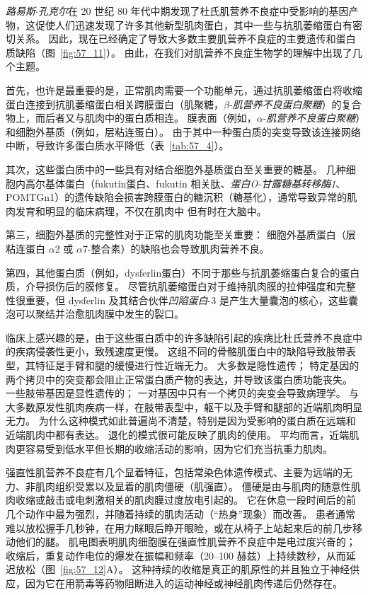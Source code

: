 \textit{路易斯$\cdot$孔克尔}在 20 世纪 80 年代中期发现了杜氏肌营养不良症中受影响的基因产物，这促使人们迅速发现了许多其他新型肌肉蛋白，其中一些与抗肌萎缩蛋白有密切关系。
因此，现在已经确定了导致大多数主要肌营养不良症的主要遗传和蛋白质缺陷（图~\ref{fig:57_11}）。
由此，在我们对肌营养不良症生物学的理解中出现了几个主题。


首先，也许是最重要的是，正常肌肉需要一个功能单元，通过抗肌萎缩蛋白将收缩蛋白连接到抗肌萎缩蛋白相关跨膜蛋白（肌聚糖，$\beta $-\textit{肌营养不良蛋白聚糖}）的复合物上，而后者又与肌肉中的蛋白质相连。
膜表面（例如，$\alpha$-\textit{肌营养不良蛋白聚糖}）和细胞外基质（例如，层粘连蛋白）。
由于其中一种蛋白质的突变导致该连接网络中断，导致许多蛋白质水平降低（表~\ref{tab:57_4}）。


其次，这些蛋白质中的一些具有对结合细胞外基质蛋白至关重要的糖基。
几种细胞内高尔基体蛋白（fukutin蛋白、fukutin 相关肽、\textit{蛋白O-甘露糖基转移酶1}、POMTGn1）的遗传缺陷会损害跨膜蛋白的糖沉积（糖基化），通常导致异常的肌肉发育和明显的临床病理，不仅在肌肉中 但有时在大脑中。


第三，细胞外基质的完整性对于正常的肌肉功能至关重要：
细胞外基质蛋白（层粘连蛋白 $\alpha$2 或 $\alpha$7-整合素）的缺陷也会导致肌肉营养不良。


第四，其他蛋白质（例如，dysferlin蛋白）不同于那些与抗肌萎缩蛋白复合的蛋白质，介导损伤后的膜修复。
尽管抗肌萎缩蛋白对于维持肌肉膜的拉伸强度和完整性很重要，但 dysferlin 及其结合伙伴\textit{凹陷蛋白}-3 是产生大量囊泡的核心，这些囊泡可以聚结并治愈肌肉膜中发生的裂口。


临床上感兴趣的是，由于这些蛋白质中的许多缺陷引起的疾病比杜氏营养不良症中的疾病侵袭性更小，致残速度更慢。
这组不同的骨骼肌蛋白中的缺陷导致肢带表型，其特征是手臂和腿的缓慢进行性近端无力。
大多数是隐性遗传； 特定基因的两个拷贝中的突变都会阻止正常蛋白质产物的表达，并导致该蛋白质功能丧失。
一些肢带基因是显性遗传的；
一对基因中只有一个拷贝的突变会导致病理学。
与大多数原发性肌肉疾病一样，在肢带表型中，躯干以及手臂和腿部的近端肌肉明显无力。
为什么这种模式如此普遍尚不清楚，特别是因为受影响的蛋白质在远端和近端肌肉中都有表达。
退化的模式很可能反映了肌肉的使用。
平均而言，近端肌肉更容易受到低水平但长期的收缩活动的影响，因为它们充当抗重力肌肉。


强直性肌营养不良症有几个显着特征，包括常染色体遗传模式、主要为远端的无力、非肌肉组织受累以及显着的肌肉僵硬（肌强直）。
僵硬是由与肌肉的随意性肌肉收缩或敲击或电刺激相关的肌肉膜过度放电引起的。
它在休息一段时间后的前几个动作中最为强烈，并随着持续的肌肉活动（“热身”现象）而改善。
患者通常难以放松握手几秒钟，在用力眯眼后睁开眼睑，或在从椅子上站起来后的前几步移动他们的腿。
肌电图表明肌肉细胞膜在强直性肌营养不良症中是电过度兴奋的；
收缩后，重复动作电位的爆发在振幅和频率（20–100 赫兹）上持续数秒，从而延迟放松（图~\ref{fig:57_12}A）。
这种持续的收缩是真正的肌原性的并且独立于神经供应，因为它在用箭毒等药物阻断进入的运动神经或神经肌肉传递后仍然存在。


